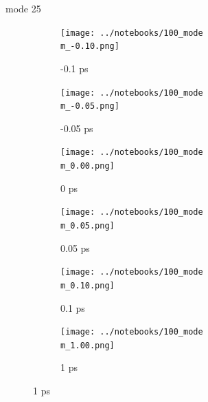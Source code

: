 \documentclass{beamer}
\begin{document}
\renewcommand\m{25}
\begin{frame}{mode \m}
	\begin{figure}
		\centering
		\begin{subfigure}[b]{\w\textwidth}
			\centering
			\texttt{[image: ../notebooks/100\_mode\\m\_-0.10.png]}
			\caption{-0.1 ps}
		\end{subfigure}
		\begin{subfigure}[b]{\w\textwidth}
			\centering
			\texttt{[image: ../notebooks/100\_mode\\m\_-0.05.png]}
			\caption{-0.05 ps}
		\end{subfigure}
		\begin{subfigure}[b]{\w\textwidth}
			\centering
			\texttt{[image: ../notebooks/100\_mode\\m\_0.00.png]}
			\caption{0 ps}
		\end{subfigure}
		\begin{subfigure}[b]{\w\textwidth}
			\centering
			\texttt{[image: ../notebooks/100\_mode\\m\_0.05.png]}
			\caption{0.05 ps}
		\end{subfigure}
		\begin{subfigure}[b]{\w\textwidth}
			\centering
			\texttt{[image: ../notebooks/100\_mode\\m\_0.10.png]}
			\caption{0.1 ps}
		\end{subfigure}
		\begin{subfigure}[b]{\w\textwidth}
			\centering
			\texttt{[image: ../notebooks/100\_mode\\m\_1.00.png]}
			\caption{1 ps}
		\end{subfigure}
	\end{figure}
\end{frame}
\end{document}

